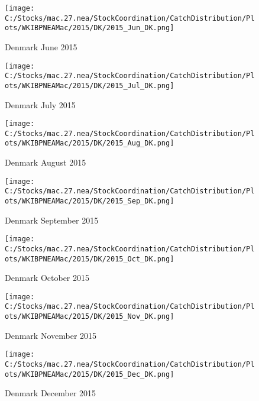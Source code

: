 \documentclass{article}
\begin{document}
\begin{figure}
	\centering
		\texttt{[image: C:/Stocks/mac.27.nea/StockCoordination/CatchDistribution/Plots/WKIBPNEAMac/2015/DK/2015\_Jun\_DK.png]}
	\caption{Denmark June 2015}
	\label{fig:2015_Jun_DK}
\end{figure}

\begin{figure}
	\centering
		\texttt{[image: C:/Stocks/mac.27.nea/StockCoordination/CatchDistribution/Plots/WKIBPNEAMac/2015/DK/2015\_Jul\_DK.png]}
	\caption{Denmark July 2015}
	\label{fig:2015_Jul_DK}
\end{figure}

\begin{figure}
	\centering
		\texttt{[image: C:/Stocks/mac.27.nea/StockCoordination/CatchDistribution/Plots/WKIBPNEAMac/2015/DK/2015\_Aug\_DK.png]}
	\caption{Denmark August 2015}
	\label{fig:2015_Aug_DK}
\end{figure}

\begin{figure}
	\centering
		\texttt{[image: C:/Stocks/mac.27.nea/StockCoordination/CatchDistribution/Plots/WKIBPNEAMac/2015/DK/2015\_Sep\_DK.png]}
	\caption{Denmark September 2015}
	\label{fig:2015_Sep_DK}
\end{figure}

\begin{figure}
	\centering
		\texttt{[image: C:/Stocks/mac.27.nea/StockCoordination/CatchDistribution/Plots/WKIBPNEAMac/2015/DK/2015\_Oct\_DK.png]}
	\caption{Denmark October 2015}
	\label{fig:2015_Oct_DK}
\end{figure}

\begin{figure}
	\centering
		\texttt{[image: C:/Stocks/mac.27.nea/StockCoordination/CatchDistribution/Plots/WKIBPNEAMac/2015/DK/2015\_Nov\_DK.png]}
	\caption{Denmark November 2015}
	\label{fig:2015_Nov_DK}
\end{figure}

\begin{figure}
	\centering
		\texttt{[image: C:/Stocks/mac.27.nea/StockCoordination/CatchDistribution/Plots/WKIBPNEAMac/2015/DK/2015\_Dec\_DK.png]}
	\caption{Denmark December 2015}
	\label{fig:2015_Dec_DK}
\end{figure}

\clearpage

\newpage
\end{document}
